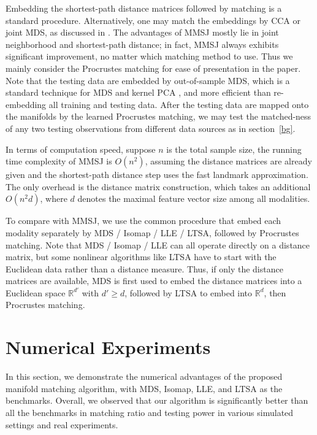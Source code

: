 \documentclass[times,twocolumn,final]{elsarticle}
\begin{document}
Embedding the shortest-path distance matrices followed by matching is a standard procedure. Alternatively, one may match the embeddings by CCA or joint MDS, as discussed in \citep{PriebeMarchette2012, FishkindShenPriebe2016}. The advantages of MMSJ mostly lie in joint neighborhood and shortest-path distance; in fact, MMSJ always exhibits significant improvement, no matter which matching method to use. Thus we mainly consider the Procrustes matching for ease of presentation in the paper. Note that the testing data are embedded by out-of-sample MDS, which is a standard technique for MDS and kernel PCA \citep{ScholkopfSmolaMuller1998,BengioEtal2003,TrossetPriebe2008}, and more efficient than re-embedding all training and testing data. After the testing data are mapped onto the manifolds by the learned Procrustes matching, we may test the matched-ness of any two testing observations from different data sources as in section~\ref{bg}.

In terms of computation speed, suppose $n$ is the total sample size, the running time complexity of MMSJ is $O(n^2)$, assuming the distance matrices are already given and the shortest-path distance step uses the fast landmark approximation. The only overhead is the distance matrix construction, which takes an additional $O(n^2 d)$, where $d$ denotes the maximal feature vector size among all modalities.

To compare with MMSJ, we use the common procedure that embed each modality separately by MDS / Isomap / LLE / LTSA, followed by Procrustes matching. Note that MDS / Isomap / LLE can all operate directly on a distance matrix, but some nonlinear algorithms like LTSA have to start with the Euclidean data rather than a distance measure. Thus, if only the distance matrices are available, MDS is first used to embed the distance matrices into a Euclidean space $\mathbb{R}^{d'}$ with $d' \geq d$, followed by LTSA to embed into $\mathbb{R}^{d}$, then Procrustes matching.

\section{Numerical Experiments}
\label{numer}
In this section, we demonstrate the numerical advantages of the proposed manifold matching algorithm, with MDS, Isomap, LLE, and LTSA as the benchmarks. Overall, we observed that our algorithm is significantly better than all the benchmarks in matching ratio and testing power in various simulated settings and real experiments.
\end{document}

